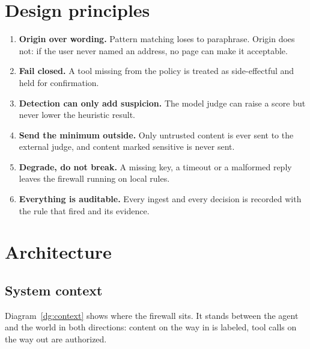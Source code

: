 \documentclass[11pt,a4paper]{article}
\begin{document}
\section{Design principles}
\begin{enumerate}
  \item \textbf{Origin over wording.} Pattern matching loses to paraphrase. Origin does not: if the user never named an address, no page can make it acceptable.
  \item \textbf{Fail closed.} A tool missing from the policy is treated as side-effectful and held for confirmation.
  \item \textbf{Detection can only add suspicion.} The model judge can raise a score but never lower the heuristic result.
  \item \textbf{Send the minimum outside.} Only untrusted content is ever sent to the external judge, and content marked sensitive is never sent.
  \item \textbf{Degrade, do not break.} A missing key, a timeout or a malformed reply leaves the firewall running on local rules.
  \item \textbf{Everything is auditable.} Every ingest and every decision is recorded with the rule that fired and its evidence.
\end{enumerate}

\section{Architecture}

\subsection{System context}
Diagram~\ref{dg:context} shows where the firewall sits. It stands between the agent and the world in both directions: content on the way in is labeled, tool calls on the way out are authorized.
\end{document}
